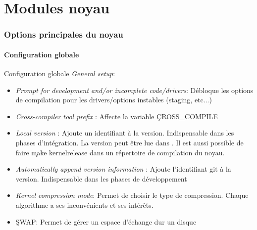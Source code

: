 %
%

\part{Modules noyau}

\begin{frame}
  \partpage
\end{frame}

\begin{frame}
  \tableofcontents[currentpart]
\end{frame}


\section{Options principales du noyau}

\subsection{Configuration globale}

\begin{frame}[fragile=singleslide]{Configuration globale}
  \emph{General setup}:
  \begin{itemize} 
  \item \emph{Prompt for  development and/or incomplete code/drivers}:
    Débloque  les  options  de  compilation  pour  les  drivers/options
    instables (staging, etc...)
  \item  \emph{Cross-compiler  tool  prefix}  :  Affecte  la  variable
    \c{CROSS_COMPILE}
  \item   \emph{Local  version}   :   Ajoute  un   identifiant  à   la
    version. Indispensable  dans les phases  d'intégration. La version
    peut être lue dans  . Il est aussi possible de
    faire \c{make kernelrelease} dans  un répertoire de compilation du
    noyau.
  \item  \emph{Automatically  append  version  information}  :  Ajoute
    l'identifiant git  à la version. Indispensable dans  les phases de
    développement
  \item \emph{Kernel  compression mode}: Permet de choisir  le type de
    compression.   Chaque  algorithme   a  ses  inconvénients  et  ses
    intérêts.
  \item \c{SWAP}: Permet de gérer un espace d'échange dur un disque
  \end{itemize}
\end{frame}


